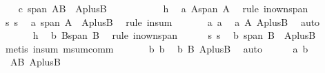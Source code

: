 \begin{isabellebody}
\ \ \isamarkupfalse%
\ c{}{\isacharcolon}\ {\isachardoublequoteopen}span\ {\isacharparenleft}A{\isasymunion}B{\isacharparenright}\ {\isasymsubseteq}\ {\isacharquery}AplusB{\isachardoublequoteclose}\isanewline
\isanewline
\ \ \isamarkupfalse%
\ {\isacharminus}\isanewline
\ \ \ \ \isamarkupfalse%
\ \ h{}\ \isamarkupfalse%
\ a{}{\isacharcolon}\ {\isachardoublequoteopen}A{\isasymsubseteq}span\ A{\isachardoublequoteclose}\ \isamarkupfalse%
\ {\isacharparenleft}rule\ in{\isacharunderscore}own{\isacharunderscore}span{\isacharparenright}\isanewline
\ \ \ \ \isamarkupfalse%
\ s{}\ s{}\ \isamarkupfalse%
\ a{}{\isacharcolon}\ {\isachardoublequoteopen}span\ A\ {\isasymsubseteq}\ {\isacharquery}AplusB{\isachardoublequoteclose}\ \isamarkupfalse%
\ {\isacharparenleft}rule\ in{\isacharunderscore}sum{\isacharparenright}\ \isanewline
\ \ \ \ \isamarkupfalse%
\ a{}\ a{}\ \isamarkupfalse%
\ a{}{\isacharcolon}\ {\isachardoublequoteopen}A{\isasymsubseteq}\ {\isacharquery}AplusB{\isachardoublequoteclose}\ \isamarkupfalse%
\ auto\isanewline
\ \ \ \ \isanewline
\ \ \ \ \isamarkupfalse%
\ \ h{}\ \isamarkupfalse%
\ b{}{\isacharcolon}\ {\isachardoublequoteopen}B{\isasymsubseteq}span\ B{\isachardoublequoteclose}\ \isamarkupfalse%
\ {\isacharparenleft}rule\ in{\isacharunderscore}own{\isacharunderscore}span{\isacharparenright}\isanewline
\ \ \ \ \isamarkupfalse%
\ s{}\ s{}\ \isamarkupfalse%
\ b{}{\isacharcolon}\ {\isachardoublequoteopen}span\ B\ {\isasymsubseteq}\ {\isacharquery}AplusB{\isachardoublequoteclose}\ \isamarkupfalse%
\ {\isacharparenleft}metis\ in{\isacharunderscore}sum\ msum{\isacharunderscore}comm{\isacharparenright}\ \isanewline
\ \ \ \ \isamarkupfalse%
\ b{}\ b{}\ \isamarkupfalse%
\ b{}{\isacharcolon}\ {\isachardoublequoteopen}B{\isasymsubseteq}\ {\isacharquery}AplusB{\isachardoublequoteclose}\ \isamarkupfalse%
\ auto\isanewline
\ \ \ \ \isamarkupfalse%
\ a{}\ b{}\ \isamarkupfalse%
\ {}{\isacharcolon}\ {\isachardoublequoteopen}A{\isasymunion}B{\isasymsubseteq}\ {\isacharquery}AplusB{\isachardoublequoteclose}\ \isamarkupfalse%

\end{isabellebody}
